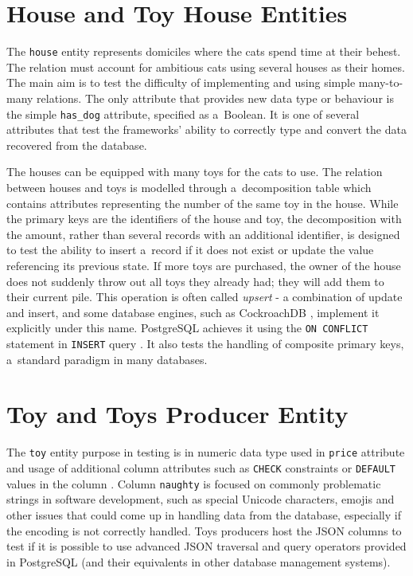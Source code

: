 \section{House and Toy House Entities}
The \texttt{house} entity represents domiciles where the cats spend time at
their behest. The relation must account for ambitious cats using several houses
as their homes. The main aim is to test the difficulty of implementing and using
simple many-to-many relations. The only attribute that provides new data type or
behaviour is the simple \verb|has_dog| attribute, specified as a~Boolean. It is
one of several attributes that test the frameworks' ability to correctly type
and convert the data recovered from the database.

The houses can be equipped with many toys for the cats to use. The relation
between houses and toys is modelled through a~decomposition table which contains
attributes representing the number of the same toy in the house. While the
primary keys are the identifiers of the house and toy, the decomposition with
the amount, rather than several records with an additional identifier, is
designed to test the ability to insert a~record if it does not exist or update
the value referencing its previous state. If more toys are purchased, the owner
of the house does not suddenly throw out all toys they already had; they will
add them to their current pile. This operation is often called \textit{upsert} -
a combination of update and insert, and some database engines, such as
CockroachDB \cite{upsertCockroachDB}, implement it explicitly under this name.
PostgreSQL achieves it using the \texttt{ON CONFLICT} statement in
\texttt{INSERT} query \cite{INSERT_postgres_2023}. It also tests the handling of
composite primary keys, a~standard paradigm in many databases.

\section{Toy and Toys Producer Entity}
The \texttt{toy} entity purpose in testing is in numeric data type used in
\texttt{price} attribute and usage of additional column attributes such as
\texttt{CHECK} constraints or \texttt{DEFAULT} values in the column
\cite{Constraints_Postgres_2023}. Column \texttt{naughty} is focused on commonly
problematic strings in software development, such as special Unicode characters,
emojis and other issues that could come up in handling data from the database,
especially if the encoding is not correctly handled. Toys producers host the
JSON columns to test if it is possible to use advanced JSON traversal and query
operators provided in PostgreSQL \cite{postgres-json} (and their equivalents in
other database management systems).
